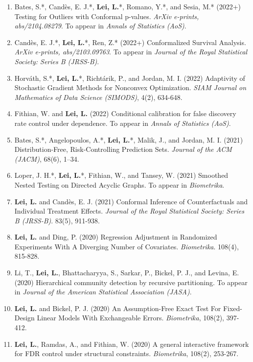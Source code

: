 \documentclass{article}
\begin{document}
\begin{enumerate}
\item Bates, S.*, Cand\`{e}s, E. J.*, \textbf{Lei, L.}*, Romano, Y.*, and Sesia, M.* (2022+) Testing for Outliers with Conformal p-values. \emph{ArXiv e-prints, abs/2104.08279}. To appear in \emph{Annals of Statistics (AoS)}.  
\item Cand\`{e}s, E. J.*, \textbf{Lei, L.}*, Ren, Z.* (2022+) Conformalized Survival Analysis. \emph{ArXiv e-prints, abs/2103.09763}. To appear in \emph{Journal of the Royal Statistical Society: Series B (JRSS-B)}.
\item Horv\'{a}th, S.*, \textbf{Lei, L.}*, Richt\'{a}rik, P., and Jordan, M. I. (2022) Adaptivity of Stochastic Gradient Methods for Nonconvex Optimization. \emph{SIAM Journal on Mathematics of Data Science (SIMODS)}, 4(2), 634-648.
\item Fithian, W. and \textbf{Lei, L.} (2022) Conditional calibration for false discovery rate control under dependence. To appear in \emph{Annals of Statistics (AoS)}.
\item Bates, S.*, Angelopoulos, A.*, \textbf{Lei, L.}*, Malik, J., and Jordan, M. I. (2021) Distribution-Free, Risk-Controlling Prediction Sets. \emph{Journal of the ACM (JACM)}, 68(6), 1–34.
\item Loper, J. H.*, \textbf{Lei, L.}*, Fithian, W., and Tansey, W. (2021) Smoothed Nested Testing on Directed Acyclic Graphs. To appear in \emph{Biometrika}.
\item \textbf{Lei, L.} and Cand\`{e}s, E. J. (2021) Conformal Inference of Counterfactuals and Individual Treatment Effects. \emph{Journal of the Royal Statistical Society: Series B (JRSS-B)}. 83(5), 911-938.
\item \textbf{Lei, L.} and Ding, P. (2020) Regression Adjustment in Randomized Experiments With A Diverging Number of Covariates. \emph{Biometrika}. 108(4), 815-828.
\item Li, T., \textbf{Lei, L.}, Bhattacharyya, S., Sarkar, P., Bickel, P. J., and Levina, E. (2020) Hierarchical community detection by recursive partitioning. To appear in \emph{Journal of the American Statistical Association (JASA)}.
\item \textbf{Lei, L.} and Bickel, P. J. (2020) An Assumption-Free Exact Test For Fixed-Design Linear Models With Exchangeable Errors. \emph{Biometrika}, 108(2), 397-412.
\item \textbf{Lei, L.}, Ramdas, A., and Fithian, W. (2020) A general interactive framework for FDR control under structural constraints. \emph{Biometrika}, 108(2), 253-267.

\end{enumerate}
\end{document}

